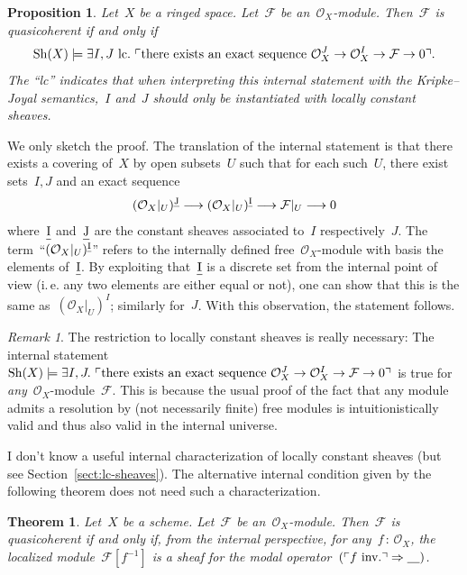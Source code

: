 \documentclass[10pt,reqno,a4paper]{amsbook}
\makeatletter
\theoremstyle{definition}
\theoremstyle{plain}
\newtheorem{prop}[defn]{Proposition}
\newtheorem{thm}[defn]{Theorem}
\theoremstyle{remark}
\newtheorem{rem}[defn]{Remark}
\newcommand{\F}{\mathcal{F}}
\renewcommand{\O}{\mathcal{O}}
\newcommand{\placeholder}{\underline{\quad}}
\let\oldul\ul
\renewcommand{\ul}[1]{\text{\oldul{$#1$}}}
\newcommand{\Sh}{\mathrm{Sh}}
\newcommand{\?}{\,{:}\,}
\renewcommand{\_}{\mathpunct{.}\,}
\newcommand{\speak}[1]{\ulcorner\text{\textnormal{#1}}\urcorner}
\newcommand{\ie}{i.\,e.\@\xspace}
\newcommand{\inv}{inv.\@}
\renewenvironment{proof}[1][\proofname]{\par
  \pushQED{\qed}%
  \normalfont \topsep6\p@\@plus6\p@\relax
  \trivlist
  \item[\hskip\labelsep
        \itshape
    #1\@addpunct{.}]\ignorespaces
}{%
  \popQED\endtrivlist\@endpefalse
}
\makeatother
\begin{document}
\begin{prop}Let~$X$ be a ringed space. Let~$\F$ be an~$\O_X$-module. Then~$\F$
is quasicoherent if and only if
\[ \Sh(X) \models \exists I,J\ \mathrm{lc}\_ \speak{there exists an
  exact sequence~$\O_X^J \to \O_X^I \to \F \to 0$}. \]
The ``\textnormal{lc}'' indicates that when interpreting this internal statement with the
Kripke--Joyal semantics,~$I$ and~$J$ should only be instantiated with
\emph{locally constant} sheaves.
\end{prop}
\begin{proof} We only sketch the proof.
The translation of the internal statement is that there exists a covering
of~$X$ by open subsets~$U$ such that for each such~$U$, there exist sets~$I,J$
and an exact sequence
\[ (\O_X|_U)^{\ul{J}} \longrightarrow (\O_X|_U)^{\ul{I}} \longrightarrow \F|_U
\longrightarrow 0 \]
where~$\ul{I}$ and~$\ul{J}$ are the constant sheaves associated to~$I$
respectively~$J$. The term~``$(\O_X|_U)^{\ul{I}}$'' refers to the internally
defined free~$\O_X$-module with basis the elements of~$\ul{I}$. By exploiting
that~$\ul{I}$ is a discrete set from the internal point of view (\ie any two
elements are either equal or not), one can show that this is the same
as~$(\O_X|_U)^I$; similarly for~$J$. With this observation, the statement
follows.
\end{proof}

\begin{rem}The restriction to locally constant sheaves is really necessary: The
internal statement~$\Sh(X) \models \exists I,J\_ \speak{there exists an
exact sequence~$\O_X^J \to \O_X^I \to \F \to 0$}$ is true for
\emph{any}~$\O_X$-module~$\F$. This is because the usual proof of the fact that
any module admits a resolution by (not necessarily finite) free modules is
intuitionistically valid and thus also valid in the internal
universe.\end{rem}

I don't know a useful internal characterization of
locally constant sheaves (but see Section~\ref{sect:lc-sheaves}). The
alternative internal condition given by the following
theorem does not need such a characterization.

\begin{thm}\label{thm:qcoh-sheafchar}
Let~$X$ be a scheme. Let~$\F$ be an~$\O_X$-module. Then~$\F$ is
quasicoherent if and only if, from the internal perspective, for any~$f\?\O_X$,
the localized module~$\F[f^{-1}]$ is a sheaf for the modal operator~$(\speak{$f$ \inv}
\Rightarrow \placeholder)$.
\end{thm}
\end{document}
